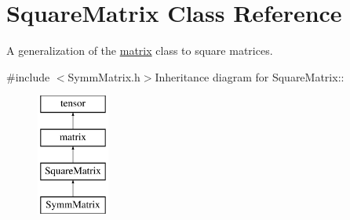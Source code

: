 \hypertarget{classJKBuilder_1_1SquareMatrix}{
\section{SquareMatrix Class Reference}
\label{classJKBuilder_1_1SquareMatrix}
}


A generalization of the \hyperlink{classJKBuilder_1_1matrix}{matrix} class to square matrices.  


{\ttfamily \#include $<$SymmMatrix.h$>$}Inheritance diagram for SquareMatrix::\begin{figure}[H]
\begin{center}
\leavevmode
\includegraphics[height=4cm]{classJKBuilder_1_1SquareMatrix}
\end{center}
\end{figure}
